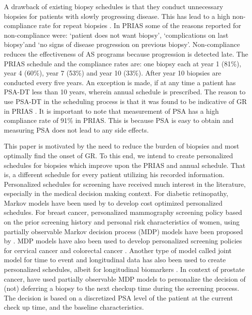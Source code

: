 A drawback of existing biopsy schedules is that they conduct unnecessary biopsies for patients with slowly progressing disease. This has lead to a high non-compliance rate for repeat biopsies \citep{bokhorst2015compliance}. In PRIAS some of the reasons reported for non-compliance were: \textquoteleft patient does not want biopsy\textquoteright, \textquoteleft complications on last biopsy\textquoteright and \textquoteleft no signs of disease progression on previous biopsy\textquoteright. Non-compliance reduces the effectiveness of AS programs because progression is detected late. The PRIAS schedule and the compliance rates are: one biopsy each at year 1 (81\%), year 4 (60\%), year 7 (53\%) and year 10 (33\%). After year 10 biopsies are conducted every five years. An exception is made, if at any time a patient has PSA-DT less than 10 years, wherein annual schedule is prescribed. The reason to use PSA-DT in the scheduling process is that it was found to be indicative of GR in PRIAS \citep{bokhorst2015compliance}. It is important to note that measurement of PSA has a high compliance rate of 91\% in PRIAS. This is because PSA is easy to obtain and measuring PSA does not lead to any side effects.

This paper is motivated by the need to reduce the burden of biopsies and most optimally find the onset of GR. To this end, we intend to create personalized schedules for biopsies which improve upon the PRIAS and annual schedule. That is, a different schedule for every patient utilizing his recorded information. Personalized schedules for screening have received much interest in the literature, especially in the medical decision making context. For diabetic retinopathy, Markov models have been used by \citet{bebu2017OptimalScreening} to develop cost optimized personalized schedules. For breast cancer, personalized mammography screening policy based on the prior screening history and personal risk characteristics of women, using partially observable Markov decision process (MDP) models have been proposed by \citet*{ayer2012or}. MDP models have also been used to develop personalized screening policies for cervical cancer \citep*{akhavan2017markov} and colorectal cancer \citep*{erenay2014optimizing}. Another type of model called joint model for time to event and longitudinal data \citep{tsiatis2004joint,rizopoulos2012joint} has also been used to create personalized schedules, albeit for longitudinal biomarkers \citep{drizopoulosPersScreening}. In context of prostate cancer, \citet{zhang2012optimization} have used partially observable MDP models to personalize the decision of (not) deferring a biopsy to the next checkup time during the screening process. The decision is based on a discretized PSA level of the patient at the current check up time, and the baseline characteristics.

